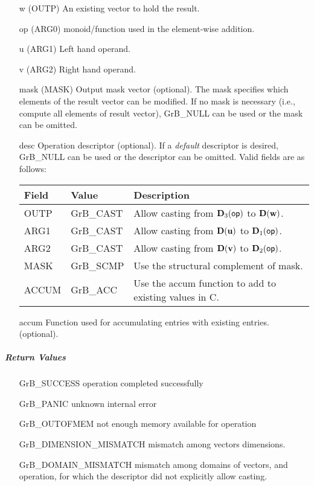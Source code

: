 \begin{itemize}[leftmargin=1.1in]
    \item[{\sf w}]     ({\sf OUTP}) An existing vector to hold the result.
    \item[{\sf op}]    ({\sf ARG0}) monoid/function used in the element-wise addition.
    \item[{\sf u}]     ({\sf ARG1}) Left hand operand.
    \item[{\sf v}]     ({\sf ARG2}) Right hand operand.

    \item[{\sf mask}] ({\sf MASK}) Output mask vector (optional). The mask
    specifies which elements of the result vector can be modified.
    If no mask is necessary (i.e., compute all elements of result
    vector), {\sf GrB\_NULL} can be used or the mask can be omitted.

    \item[{\sf desc}]  Operation descriptor (optional). If a
    \emph{default} descriptor is desired, {\sf GrB\_NULL} can be
    used or the descriptor can be omitted. Valid fields are as follows: \\
    \begin{tabular}{lll}
    Field  & Value & Description \\
    \hline
    {\sf OUTP} & {\sf GrB\_CAST} & Allow casting from $\bold{D}_3({\sf op})$ to $\bold{D}({\bf w})$. \\
    {\sf ARG1} & {\sf GrB\_CAST} & Allow casting from $\bold{D}({\bf u})$ to $\bold{D}_1({\sf op})$. \\
    {\sf ARG2} & {\sf GrB\_CAST} & Allow casting from $\bold{D}({\bf v})$ to $\bold{D}_2({\sf op})$. \\
    {\sf MASK} & {\sf GrB\_SCMP} & Use the structural complement of {\sf mask}. \\
    {\sf ACCUM}& {\sf GrB\_ACC}  & Use the {\sf accum} function to add to existing values in {\sf C}.\\
    \end{tabular}

  	\item[{\sf accum}]  Function used for accumulating entries with existing  entries. (optional).
\end{itemize}

\subparagraph{Return Values}

\begin{itemize}[leftmargin=2.1in]
\item[{\sf GrB\_SUCCESS}]             operation completed successfully
\item[{\sf GrB\_PANIC}]               unknown internal error
\item[{\sf GrB\_OUTOFMEM}]            not enough memory available for operation
\item[{\sf GrB\_DIMENSION\_MISMATCH}] mismatch among vectors dimensions.
\item[{\sf GrB\_DOMAIN\_MISMATCH}]    mismatch among domains of vectors, and operation, for which the descriptor did not explicitly allow casting.
\end{itemize}

